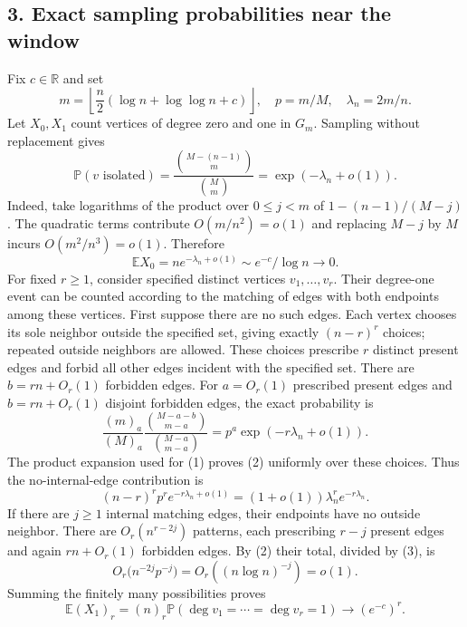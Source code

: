 \subsection*{3. Exact sampling probabilities near the window}
Fix $c\in\mathbb R$ and set
\[
 m=\left\lfloor\frac n2(\log n+\log\log n+c)\right\rfloor,
 \quad p=m/M,\quad \lambda_n=2m/n.
\]
Let $X_0,X_1$ count vertices of degree zero and one in $G_m$. Sampling without replacement gives
\[
 \mathbb P(v\text{ isolated})=
 \frac{\binom{M-(n-1)}m}{\binom Mm}
 =\exp(-\lambda_n+o(1)).
\]
Indeed, take logarithms of the product over $0\le j<m$ of $1-(n-1)/(M-j)$. The quadratic terms contribute $O(m/n^2)=o(1)$ and replacing $M-j$ by $M$ incurs $O(m^2/n^3)=o(1)$. Therefore
\[
 \mathbb EX_0=n e^{-\lambda_n+o(1)}\sim e^{-c}/\log n\longrightarrow0. \tag{1}
\]
For fixed $r\ge1$, consider specified distinct vertices $v_1,\ldots,v_r$. Their degree-one event can be counted according to the matching of edges with both endpoints among these vertices. First suppose there are no such edges. Each vertex chooses its sole neighbor outside the specified set, giving exactly $(n-r)^r$ choices; repeated outside neighbors are allowed. These choices prescribe $r$ distinct present edges and forbid all other edges incident with the specified set. There are $b=rn+O_r(1)$ forbidden edges.
For $a=O_r(1)$ prescribed present edges and $b=rn+O_r(1)$ disjoint forbidden edges, the exact probability is
\[
 \frac{(m)_a}{(M)_a}
 \frac{\binom{M-a-b}{m-a}}{\binom{M-a}{m-a}}
 =p^a\exp(-r\lambda_n+o(1)). \tag{2}
\]
The product expansion used for (1) proves (2) uniformly over these choices. Thus the no-internal-edge contribution is
\[
 (n-r)^rp^r e^{-r\lambda_n+o(1)}
 =(1+o(1))\lambda_n^r e^{-r\lambda_n}. \tag{3}
\]
If there are $j\ge1$ internal matching edges, their endpoints have no outside neighbor. There are $O_r(n^{r-2j})$ patterns, each prescribing $r-j$ present edges and again $rn+O_r(1)$ forbidden edges. By (2) their total, divided by (3), is
\[
 O_r\bigl(n^{-2j}p^{-j}\bigr)
 =O_r((n\log n)^{-j})=o(1).
\]
Summing the finitely many possibilities proves
\[
 \mathbb E(X_1)_r=(n)_r\mathbb P(\deg v_1=\cdots=\deg v_r=1)
 \longrightarrow(e^{-c})^r. \tag{4}
\]
